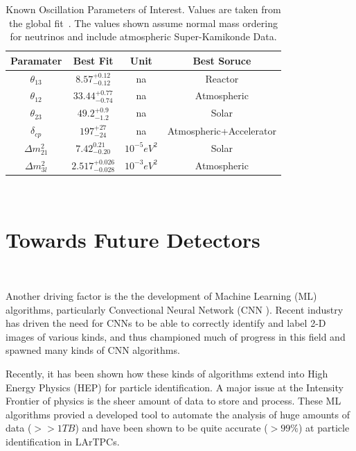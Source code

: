 \begin{table}
\begin{center}
\begin{tabular}{||c c c c||}
 \hline
 Paramater & Best Fit & Unit & Best Soruce\\ [0.5ex]
 \hline\hline
  $\theta_{13}$ & $8.57^{+0.12}_{-0.12}$ & na & Reactor \\ %
 \hline
  $\theta_{12}$ & $33.44^{+0.77}_{-0.74}$ & na & Atmospheric \\ %
 \hline
  $\theta_{23}$ & $49.2^{+0.9}_{-1.2}$ & na & Solar \\ %
 \hline
  $\delta_{cp}$ & $197^{+27}_{-24}$ & na & Atmospheric+Accelerator \\ %
 \hline
  $\Delta m_{21}^{2}$ & $7.42^{0.21}_{-0.20}$ & $10^{-5}eV^{2}$ & Solar \\ %
 \hline
  $\Delta m_{3l}^{2}$ & $2.517^{+0.026}_{-0.028}$ & $10^{-3}eV^{2}$ & Atmospheric  \\
 \hline
\end{tabular}
\caption{Known Oscillation Parameters of Interest.
Values are taken from the global fit~\citep{2020JHEP...09..178E}.
The values shown assume normal mass ordering for neutrinos and include atmospheric Super-Kamikonde Data.
}
\end{center}
\end{table}
~\label{table:pmns_params}

\section{Towards Future Detectors}~\label{sec:future_detectors}

\citep{Sadowski_2017}
Another driving factor is the the development of Machine Learning (ML) algorithms, particularly Convectional Neural Network (CNN \citep{Sadowski2017DeepLI}).
Recent industry has driven the need for CNNs to be able to correctly identify and label 2-D images of various kinds, and thus championed much of progress in this field and spawned many kinds of CNN algorithms.

Recently, it has been shown how these kinds of algorithms extend into High Energy Physics (HEP) for particle identification.
A major issue at the Intensity Frontier of physics is the sheer amount of data to store and process.
These ML algorithms provied a developed tool to automate the analysis of huge amounts of data ($>> 1 TB$) and have been shown to be quite accurate ($>99\%$) at particle identification in LArTPCs.



